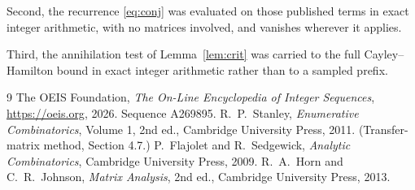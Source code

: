 \documentclass[11pt,a4paper]{article}
\theoremstyle{plain}
\theoremstyle{definition}
\begin{document}
Second, the recurrence \eqref{eq:conj} was evaluated on those published terms in exact
integer arithmetic, with no matrices involved, and vanishes wherever it applies.

Third, the annihilation test of Lemma~\ref{lem:crit} was carried to the full
Cayley--Hamilton bound in exact integer arithmetic rather than to a sampled prefix.

\begin{thebibliography}{9}
 The OEIS Foundation, \emph{The On-Line Encyclopedia of Integer
Sequences}, \url{https://oeis.org}, 2026. Sequence A269895.
 R.~P.~Stanley, \emph{Enumerative Combinatorics}, Volume 1, 2nd ed.,
Cambridge University Press, 2011. (Transfer-matrix method, Section 4.7.)
 P.~Flajolet and R.~Sedgewick, \emph{Analytic Combinatorics}, Cambridge
University Press, 2009.
 R.~A.~Horn and C.~R.~Johnson, \emph{Matrix Analysis}, 2nd ed., Cambridge
University Press, 2013.
\end{thebibliography}
\end{document}

